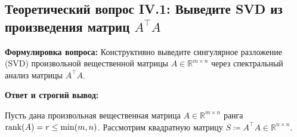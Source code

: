 
\subsection{Теоретический вопрос IV.1: Выведите SVD из произведения матриц $A^\top A$}
\textbf{Формулировка вопроса:} Конструктивно выведите сингулярное разложение (SVD) произвольной вещественной матрицы $A
\in \mathbb{R}^{m \times n}$ через спектральный анализ матрицы $A^\top A$.

\textbf{Ответ и строгий вывод:}

Пусть дана произвольная вещественная матрица $A \in \mathbb{R}^{m \times n}$ ранга $\operatorname{rank}(A) = r \le \min(m, n)$.
Рассмотрим квадратную матрицу $S \coloneqq A^\top A \in \mathbb{R}^{n \times n}$.
